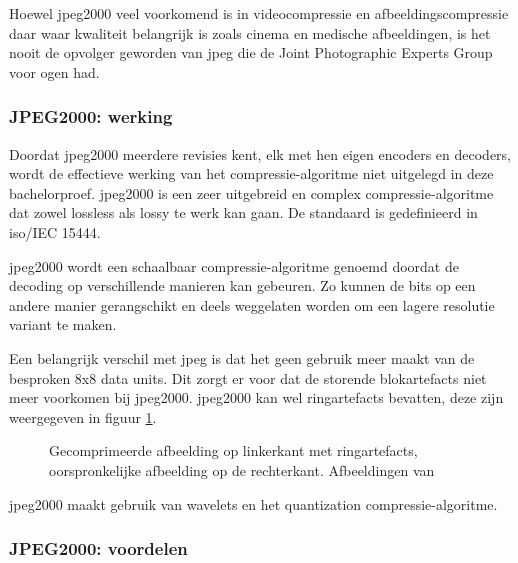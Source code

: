Hoewel \gls{jpeg2000} veel voorkomend is in \gls{videocompressie} en \gls{afbeeldingscompressie} daar waar kwaliteit belangrijk is zoals cinema en medische afbeeldingen, is het nooit de opvolger geworden van \gls{jpeg} die de Joint Photographic Experts Group voor ogen had.


\subsubsection{JPEG2000: werking}
\label{sec:afbeeldingscompressie-jpeg2000-werking}

Doordat \gls{jpeg2000} meerdere revisies kent, elk met hen eigen \glspl{encoder} en \glspl{decoder}, wordt de effectieve werking van het \gls{compressie-algoritme} niet uitgelegd in deze bachelorproef. \Gls{jpeg2000} is een zeer uitgebreid en complex \gls{compressie-algoritme} dat zowel \gls{lossless} als \gls{lossy} te werk kan gaan. De standaard is gedefinieerd in \gls{iso}/IEC 15444.

\Gls{jpeg2000} wordt een schaalbaar \gls{compressie-algoritme} genoemd doordat de \gls{decoding} op verschillende manieren kan gebeuren. Zo kunnen de \glspl{bit} op een andere manier gerangschikt en deels weggelaten worden om een lagere resolutie variant te maken.

Een belangrijk verschil met \gls{jpeg} is dat het geen gebruik meer maakt van de besproken 8x8 data units. Dit zorgt er voor dat de storende blok\glspl{artefact} niet meer voorkomen bij \gls{jpeg2000}. \Gls{jpeg2000} kan wel ring\glspl{artefact} bevatten, deze zijn weergegeven in figuur \ref{fig:ring-artefact}.

\begin{figure}
	\centering
	\caption{Gecomprimeerde afbeelding op linkerkant met ring\glspl{artefact}, oorspronkelijke afbeelding op de rechterkant. Afbeeldingen van \cite{ringartefact}}
	\label{fig:ring-artefact}
\end{figure}

\gls{jpeg2000} maakt gebruik van \glspl{wavelet} en het quantization \gls{compressie-algoritme}.

\subsubsection{JPEG2000: voordelen}
\label{sec:afbeeldingscompressie-jpeg2000-voordelen}

